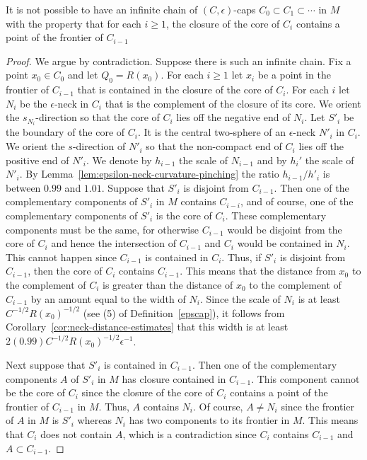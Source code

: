 \begin{claim}
\label{claim:no-infinite-chain-of-caps}
It is not possible to have an infinite chain of $(C,\epsilon)$-caps
$C_0\subset C_1\subset \cdots$ in $M$ with the property that for
each $i\ge 1$, the closure of the core of $C_i$ contains a point of
the frontier of $C_{i-1}$
\end{claim}

\begin{proof}
\sketch
{}
We argue by contradiction. Suppose there is such an infinite chain.
Fix a point $x_0\in C_0$ and let $Q_0=R(x_0)$. For each $i\ge 1$ let
$x_i$ be a point in the frontier of $C_{i-1}$ that is contained in
the closure of the core of $C_i$. For each $i$ let $N_i$ be the
$\epsilon$-neck in $C_{i}$ that is the complement of the closure of
its core. We orient the $s_{N_{i}}$-direction so that the core of
$C_{i}$ lies off the negative end of $N_{i}$. Let $S'_i$ be the
boundary of the core of $C_i$. It is the central two-sphere of an
$\epsilon$-neck $N'_i$ in $C_i$. We orient the $s$-direction of
$N'_i$ so that the non-compact end of $C_i$ lies off the positive
end of $N'_i$. We denote by $h_{i-1}$ the scale of $N_{i-1}$ and by
$h_i'$ the scale of $N'_i$. By Lemma~\ref{lem:epsilon-neck-curvature-pinching} the ratio
$h_{i-1}/h'_i$ is between $0.99$ and $1.01$. Suppose that $S'_i$ is
disjoint from $C_{i-1}$. Then one of the complementary components of
$S'_i$ in $M$ contains $C_{i-i}$, and of course, one of the
complementary components of $S'_i$ is the core of $C_i$. These
complementary components must be the same, for otherwise $C_{i-1}$
would be disjoint from the core of $C_i$ and hence the intersection
of $C_{i-1}$ and $C_i$ would be contained in $N_i$. This cannot
happen since  $C_{i-1}$ is contained in $C_i$. Thus, if $S'_i$ is
disjoint from $C_{i-1}$, then the core of $C_i$ contains $C_{i-1}$.
 This means that the distance from $x_0$ to the
complement of $C_i$ is greater than the distance of $x_0$ to the
complement of $C_{i-1}$ by an amount equal to the width of $N_i$.
Since the scale of $N_i$ is at least $C^{-1/2}R(x_0)^{-1/2}$ (see
(5) of Definition~\ref{epscap}), it follows from
Corollary~\ref{cor:neck-distance-estimates} that this width is at least
$2(0.99)C^{-1/2}R(x_0)^{-1/2}\epsilon^{-1}$.

Next suppose that $S'_i$ is contained in $C_{i-1}$. Then one of the
complementary components $A$ of $S'_i$ in $M$ has closure contained
in $C_{i-1}$. This component cannot be the core of $C_i$ since the
closure of the core of $C_i$ contains a point of the frontier of
$C_{i-1}$ in $M$. Thus, $A$ contains $N_i$. Of course, $A\not= N_i$
since the frontier of $A$ in $M$ is $S'_i$ whereas $N_i$ has two
components to its frontier in $M$. This means that $C_i$ does not
contain $A$, which is a contradiction since $C_i$ contains $C_{i-1}$
and $A\subset C_{i-1}$.


\end{proof}
